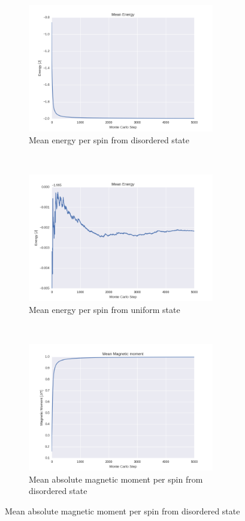 \documentclass[a4paper, 10pt]{article}
\begin{document}
\begin{figure}[!ht]
    \centering
    \begin{subfigure}[H!]{0.5\textwidth}
        \centering
        \includegraphics[height=2.2in]{meanEnergyWRandomStart.png}
        \caption{Mean energy per spin from disordered state}
    \end{subfigure}%
    ~ 
    \begin{subfigure}[H!]{0.5\textwidth}
        \centering
        \includegraphics[height=2.2in]{meanEnergyWUpStart.png}
        \caption{Mean energy per spin from uniform state}
    \end{subfigure}
        ~
     \begin{subfigure}[H!]{0.5\textwidth}
        \centering
        \includegraphics[height=2.2in]{meanMagMomWRandomStart.png}
        \caption{Mean absolute magnetic moment per spin from disordered state}
    \end{subfigure}%

\end{figure}
\end{document}
